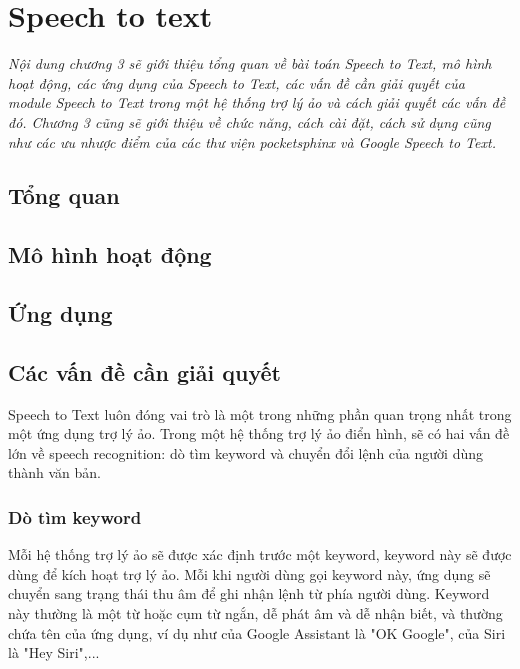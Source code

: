 \chapter{Speech to text}
\ifpdf
    \graphicspath{{Chapter3/Chapter3Figs/PNG/}{Chapter3/Chapter3Figs/PDF/}{Chapter3/Chapter3Figs/}}
\else
    \graphicspath{{Chapter3/Chapter3Figs/EPS/}{Chapter3/Chapter3Figs/}}
\fi

\textit{Nội dung chương 3 sẽ giới thiệu tổng quan về bài toán Speech to Text, mô hình hoạt động, các ứng dụng của Speech to Text, các vấn đề cần giải quyết của module Speech to Text trong một hệ thống trợ lý ảo và cách giải quyết các vấn đề đó. Chương 3 cũng sẽ giới thiệu về chức năng, cách cài đặt, cách sử dụng cũng như các ưu nhược điểm của các thư viện pocketsphinx và Google Speech to Text.}

\section{Tổng quan}

\section{Mô hình hoạt động}

\section{Ứng dụng}

\section{Các vấn đề cần giải quyết}

Speech to Text luôn đóng vai trò là một trong những phần quan trọng nhất trong một ứng dụng trợ lý ảo. Trong một hệ thống trợ lý ảo điển hình, sẽ có hai vấn đề lớn về speech recognition: dò tìm keyword và chuyển đổi lệnh của người dùng thành văn bản.

\subsection{Dò tìm keyword}

Mỗi hệ thống trợ lý ảo sẽ được xác định trước một keyword, keyword này sẽ được dùng để kích hoạt trợ lý ảo. Mỗi khi người dùng gọi keyword này, ứng dụng sẽ chuyển sang trạng thái thu âm để ghi nhận lệnh từ phía người dùng. Keyword này thường là một từ hoặc cụm từ ngắn, dễ phát âm và dễ nhận biết, và thường chứa tên của ứng dụng, ví dụ như của Google Assistant là "OK Google", của Siri là "Hey Siri",...

